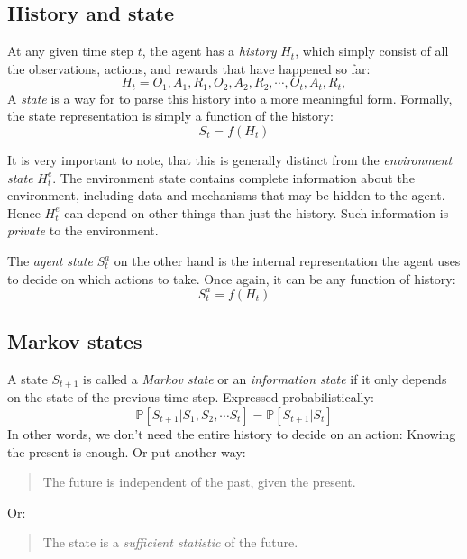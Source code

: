 \documentclass[12pt, a4paper]{article}
\numberwithin{equation}{section}
\begin{document}
\subsection{History and state}
At any given time step $t$, the agent has a \textit{history} $H_t$, which simply consist of all the observations, actions, and rewards that have happened so far:
\begin{equation}
H_t=O_1,A_1,R_1,O_2,A_2,R_2,\cdots,O_t,A_t,R_t,
\end{equation}
A \textit{state} is a way for to parse this history into a more meaningful form. Formally, the state representation is simply a function of the history:
\begin{equation}
S_t=f(H_t)
\end{equation}

It is very important to note, that this is generally distinct from the \textit{environment state} $H^e_t$. The environment state contains complete information about the environment, including data and mechanisms that may be hidden to the agent. Hence $H^e_t$ can depend on other things than just the history. Such information is \textit{private} to the environment.

The \textit{agent state} $S^a_t$ on the other hand is the internal representation the agent uses to decide on which actions to take. Once again, it can be any function of history:
\begin{equation}
S^a_t=f(H_t)
\end{equation}

\subsection{Markov states}
A state $S_{t+1}$ is called a \textit{Markov state} or an \textit{information state} if it only depends on the state of the previous time step. Expressed probabilistically:
\begin{equation}
\mathbb{P}[S_{t+1}|S_1,S_2,\cdots S_t]=\mathbb{P}[S_{t+1}|S_t]
\end{equation}
In other words, we don't need the entire history to decide on an action: Knowing the present is enough. Or put another way:
\begin{quotation}
The future is independent of the past, given the present.
\end{quotation}
Or:
\begin{quotation}
The state is a \textit{sufficient statistic} of the future.
\end{quotation}
\end{document}
